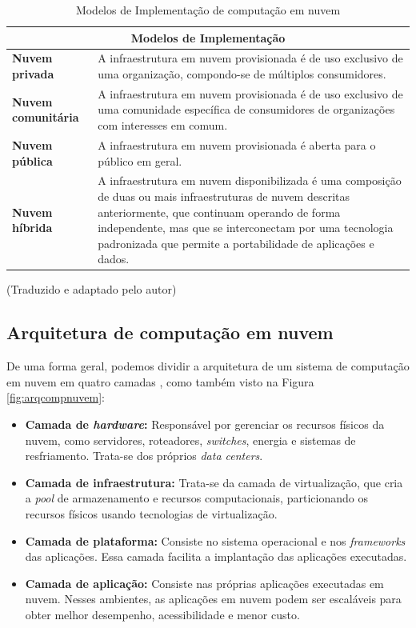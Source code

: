 \documentclass[
	12pt,				%
	a4paper,			%
	english,			%
	french,				%
	spanish,			%
	brazil				%
	]{abntex2}
\begin{document}
\begin{table}[H]
\ABNTEXchapterfont
\centering
\label{tab:modelos}
\caption{Modelos de Implementação de computação em nuvem}
\begin{tabular}{|m{3.8cm}|m{11.0cm}|}
    \hline
    \multicolumn{2}{|c|}{\centering\textbf{Modelos de Implementação}}\\
    \hline
    \hline
	\centering\textbf{Nuvem privada} & A infraestrutura em nuvem provisionada é de uso exclusivo de uma organização, compondo-se de múltiplos consumidores. \\
	\hline
	\centering\textbf{Nuvem comunitária} & A infraestrutura em nuvem provisionada é de uso exclusivo de uma comunidade específica de consumidores de organizações com interesses em comum.\\
	\hline
	\centering\textbf{Nuvem pública} & A infraestrutura em nuvem provisionada é aberta para o público em geral.\\
	\hline
	\centering\textbf{Nuvem híbrida} & A infraestrutura em nuvem disponibilizada é uma composição de duas ou mais infraestruturas de nuvem descritas anteriormente, que continuam operando de forma independente, mas que se interconectam por uma tecnologia padronizada que permite a portabilidade de aplicações e dados.\\
	\hline
	\end{tabular}
	\textual (Traduzido e adaptado pelo autor)
\end{table}


\subsection{Arquitetura de computação em nuvem}\label{sec_arq_comp}

De uma forma geral, podemos dividir a arquitetura de um sistema de computação em nuvem em quatro camadas \cite{zhang2010cloud}, como também visto na Figura \ref{fig:arqcompnuvem}:

\begin{itemize}
    \item \textbf{Camada de \emph{hardware}:} Responsável por gerenciar os recursos físicos da nuvem, como servidores, roteadores, \emph{switches}, energia e sistemas de resfriamento. Trata-se dos próprios \emph{data centers}.
    \item \textbf{Camada de infraestrutura:} Trata-se da camada de virtualização, que cria a \emph{pool} de armazenamento e recursos computacionais, particionando os recursos físicos usando tecnologias de virtualização.
    \item \textbf{Camada de plataforma:} Consiste no sistema operacional e nos \emph{frameworks} das aplicações. Essa camada facilita a implantação das aplicações executadas.
    \item \textbf{Camada de aplicação:} Consiste nas próprias aplicações executadas em nuvem. Nesses ambientes, as aplicações em nuvem podem ser escaláveis para obter melhor desempenho, acessibilidade e menor custo.
\end{itemize}
\end{document}

